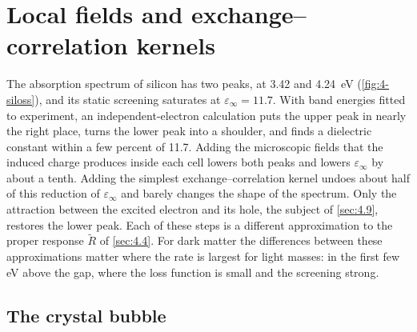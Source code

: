 \section{Local fields and exchange--correlation kernels}\label{sec:4.6}

The absorption spectrum of silicon has two peaks, at 3.42 and \SI{4.24}{eV} (\cref{fig:4-siloss}), and its static screening saturates at $\varepsilon_\infty = 11.7$. With band energies fitted to experiment, an independent-electron calculation puts the upper peak in nearly the right place, turns the lower peak into a shoulder, and finds a dielectric constant within a few percent of 11.7. Adding the microscopic fields that the induced charge produces inside each cell lowers both peaks and lowers $\varepsilon_\infty$ by about a tenth. Adding the simplest exchange--correlation kernel undoes about half of this reduction of $\varepsilon_\infty$ and barely changes the shape of the spectrum. Only the attraction between the excited electron and its hole, the subject of \cref{sec:4.9}, restores the lower peak. Each of these steps is a different approximation to the proper response $\tilde R$ of \cref{sec:4.4}. For dark matter the differences between these approximations matter where the rate is largest for light masses: in the first few eV above the gap, where the loss function is small and the screening strong.

\subsection{The crystal bubble}

